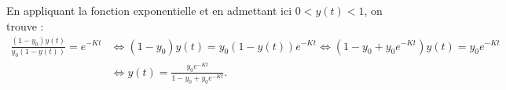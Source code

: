 \documentclass[11pt,class=report,crop=false]{standalone}
\begin{document}
En appliquant la fonction exponentielle et en admettant ici $0<y(t)<1$, on trouve :
\begin{equation*} 
	\begin{split} 
		\frac{(1 - y_0)y(t) }{y_0(1 - y(t))} = e^{-Kt} 
		& \Longleftrightarrow 
		 (1 - y_0)y(t) =  y_0 (1 - y(t))e^{-Kt} 
		\Longleftrightarrow 
		(1 - y_0 + y_0 e^{-Kt})y(t)  = y_0 e^{-Kt} \\ 
		& \Longleftrightarrow 
		y(t) = \frac{y_0 e^{-Kt}}{1 - y_0 + y_0 e^{-Kt}}. 
	\end{split} 
\end{equation*} 
\fincorrection
\finexercice
\end{document}
